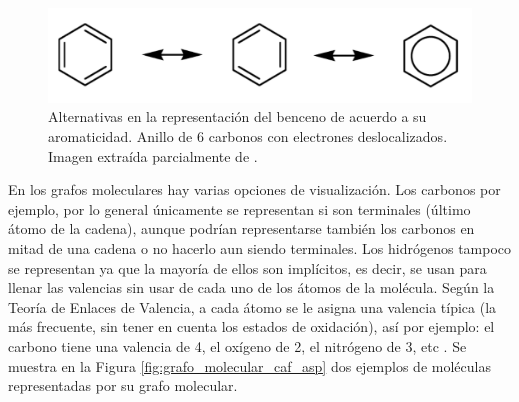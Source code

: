 \begin{figure}[h!]
    \centering
    \includegraphics[scale=0.35]{imagenes/estado_arte/teoria/benceno.png}
    \caption{Alternativas en la representación del benceno de acuerdo a su aromaticidad. Anillo de 6 carbonos con electrones deslocalizados. Imagen extraída parcialmente de \cite{iupac_manual}.}
    \label{fig:aromatico_benceno}
\end{figure}

En los grafos moleculares hay varias opciones de visualización. Los carbonos por ejemplo, por lo general únicamente se representan si son terminales (último átomo de la cadena), aunque podrían representarse también los carbonos en mitad de una cadena o no hacerlo aun siendo terminales. Los hidrógenos tampoco se representan ya que la mayoría de ellos son implícitos, es decir, se usan para llenar las valencias sin usar de cada uno de los átomos de la molécula. Según la Teoría de Enlaces de Valencia, a cada átomo se le asigna una valencia típica (la más frecuente, sin tener en cuenta los estados de oxidación), así por ejemplo: el carbono tiene una valencia de 4, el oxígeno de 2, el nitrógeno de 3, etc \cite{vbt, brown_chemoinformaticsintroduction_2009}. Se muestra en la Figura \ref{fig:grafo_molecular_caf_asp} dos ejemplos de moléculas representadas por su grafo molecular.

